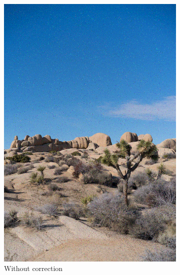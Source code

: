 \documentclass{article}
\begin{document}
\begin{figure}[htb]
\begin{subfigure}[b]{0.32\textwidth}
        \includegraphics[width=\textwidth]{../Result/linear-bsc-output.png}
        \caption{Without correction}
        \label{fig:image-linear-bsc-no-correction}
    \end{subfigure}
    \hfill
    \begin{subfigure}[b]{0.32\textwidth}
        \centering

\end{subfigure}
\end{figure}
\end{document}
